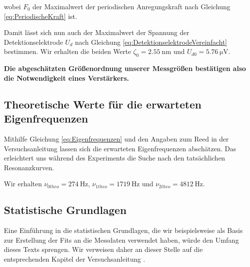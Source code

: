 wobei $F_0$ der Maximalwert der periodischen Anregungskraft nach Gleichung \ref{eq:PeriodischeKraft} ist.

Damit lässt sich nun auch der Maximalwert der Spannung der Detektionselektrode $U_d$ nach Gleichung \ref{eq:DetektionselektrodeVereinfacht} bestimmen.
Wir erhalten die beiden Werte $\zeta_0 = \SI{2.55}{\nano\meter}$ und $U_{d0} = \SI{5.76}{\micro\volt}$.

\textbf{Die abgeschätzten Größenordnung unserer Messgrößen bestätigen also die Notwendigkeit eines Verstärkers.}

\subsection{Theoretische Werte für die erwarteten Eigenfrequenzen}

Mithilfe Gleichung \ref{eq:Eigenfrequenzen} und den Angaben zum Reed in der Versuchsanleitung \cite{Anleitung} lassen sich die erwarteten Eigenfrequenzen abschätzen.
Das erleichtert uns während des Experiments die Suche nach den tatsächlichen Resonanzkurven.

Wir erhalten $\nu_{0 theo} = \SI{274}{\hertz}$, $\nu_{1 theo} = \SI{1719}{\hertz}$ und $\nu_{2 theo} = \SI{4812}{\hertz}$.
\label{eq:AbschaetzungEigenfrequenzen}

\subsection{Statistische Grundlagen}

Eine Einführung in die statistischen Grundlagen, die wir beispielsweise als Basis zur Erstellung der Fits an die Messdaten verwendet haben, würde den Umfang dieses Texts sprengen.
Wir verweisen daher an dieser Stelle auf die entsprechenden Kapitel der Versuchsanleitung \cite{Anleitung}.
